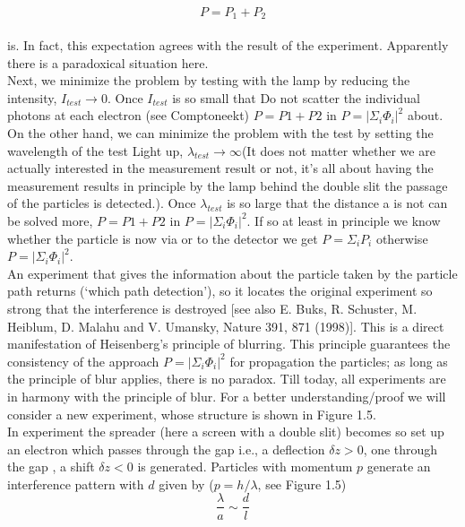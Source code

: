 \begin{equation}
P=P_{1}+P_{2}
\end{equation}\\
is. In fact, this expectation agrees with the result of the experiment. Apparently there is a paradoxical situation here.\\
Next, we minimize the problem by testing with the lamp by reducing the intensity, $I_{test}\to 0$. Once $I_{test}$ is so small that Do not scatter the individual photons at each electron (see Comptoneekt) $P = P1 + P2$ in $P = | \Sigma_i \Phi_i|^2$ about. On the other hand, we can minimize the problem with the test by setting the wavelength of the test Light up, $\lambda_{test}\to \infty$(It does not matter whether we are actually interested in the measurement result or not, it's all about having the measurement results in principle by the lamp behind the double slit the passage of the particles is detected.). Once $\lambda_{test}$ is so large that the distance a is not can be solved more, $P = P1 + P2$ in $P = | \Sigma_i \Phi_i|^2$. If so at least in principle we know whether the particle is now via  or  to the detector we get $P = \Sigma_i P_i$ otherwise $P = | \Sigma_i \Phi_i|^2$.\\
An experiment that gives the information about the particle taken by the particle path returns (`which path detection'), so it locates the original experiment so strong that the interference is destroyed [see also E. Buks, R. Schuster, M. Heiblum, D. Malahu and V. Umansky, Nature 391, 871 (1998)]. This is a direct manifestation of Heisenberg's principle of blurring. This principle guarantees the consistency of the approach $P = | \Sigma_i \Phi_i|^2$ for propagation the particles; as long as the principle of blur applies, there is no paradox. Till today, all experiments are in harmony with the principle of blur. For a better understanding/proof we will consider a new experiment, whose structure is shown in Figure  1.5.\\
In experiment the spreader (here a screen with a double slit) becomes so set up an electron which passes through the gap  i.e., a deflection $\delta z> 0$, one through the gap , a shift $\delta z <0$ is generated. Particles with momentum $p$ generate an interference pattern with $d$ given by ($p = h/ \lambda$, see Figure  1.5)
\\\begin{equation}
\frac{\lambda}{a} \sim \frac{d}{l}
\end{equation}
